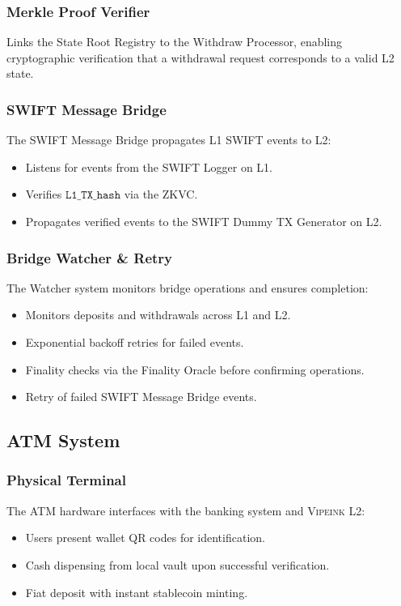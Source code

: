 \documentclass[12pt,a4paper]{article}
\theoremstyle{definition}
\theoremstyle{remark}
\newcommand{\Vipeink}{\textsc{Vipeink}}
\begin{document}
\subsubsection{Merkle Proof Verifier}

Links the State Root Registry to the Withdraw Processor, enabling cryptographic verification that a withdrawal request corresponds to a valid L2 state.

\subsubsection{SWIFT Message Bridge}
\label{sec:swift-message-bridge}

The SWIFT Message Bridge propagates L1 SWIFT events to L2:
\begin{itemize}[nosep]
    \item Listens for events from the SWIFT Logger on L1.
    \item Verifies $\texttt{L1\_TX\_hash}$ via the ZKVC.
    \item Propagates verified events to the SWIFT Dummy TX Generator on L2.
\end{itemize}

\subsubsection{Bridge Watcher \& Retry}

The Watcher system monitors bridge operations and ensures completion:
\begin{itemize}[nosep]
    \item Monitors deposits and withdrawals across L1 and L2.
    \item Exponential backoff retries for failed events.
    \item Finality checks via the Finality Oracle before confirming operations.
    \item Retry of failed SWIFT Message Bridge events.
\end{itemize}

\subsection{ATM System}
\label{sec:atm-system}

\subsubsection{Physical Terminal}

The ATM hardware interfaces with the banking system and \Vipeink{} L2:
\begin{itemize}[nosep]
    \item Users present wallet QR codes for identification.
    \item Cash dispensing from local vault upon successful verification.
    \item Fiat deposit with instant stablecoin minting.
\end{itemize}
\end{document}
